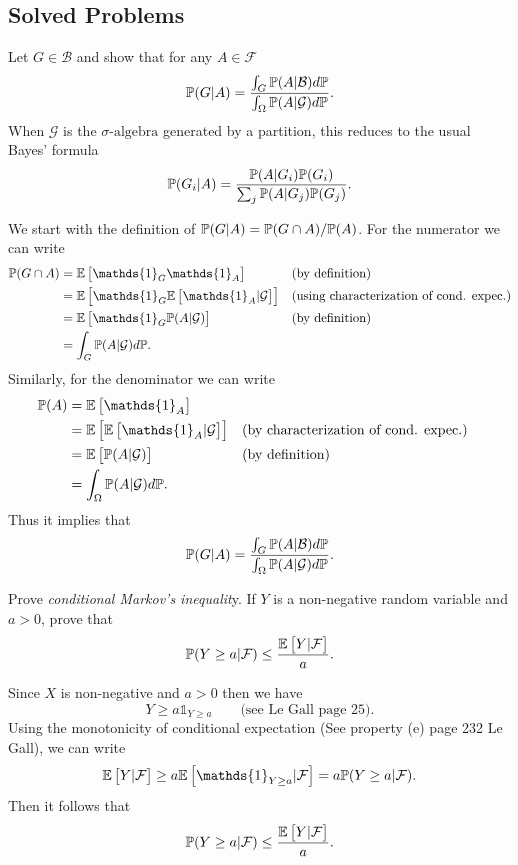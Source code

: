 \subsection{Solved Problems}
\begin{problem}
	Let $ G \in \mathcal{B} $ and show that for any $ A \in \mathcal{F} $
	\[ \mathbb{P}(G|A) = \frac{\int_G\mathbb{P}(A|\mathcal{B}) d\mathbb{P}}{\int_\Omega \mathbb{P}(A|\mathcal{G})d\mathbb{P}}.  \]
	When $ \mathcal{G} $ is the $\sigma\text{-algebra}$ generated by a partition, this reduces to the usual Bayes' formula
	\[ \mathbb{P}(G_i|A) = \frac{\mathbb{P}(A|G_i) \mathbb{P}(G_i)}{\sum_{j}\mathbb{P}(A|G_j)\mathbb{P}(G_j)}. \]
\end{problem}
\begin{solution}
	We start with the definition of $ \mathbb{P}(G|A) = \mathbb{P}(G\cap A)/\mathbb{P}(A) $. For the numerator we can write
	\begin{align*}
		\prob(G\cap A) &= \E{\mathds{1}_G\mathds{1}_A} && \text{(by definition)} \\
		&= \E{\mathds{1}_G \E{\mathds{1}_A|\mathcal{G}}} && \text{(using characterization of cond. expec.)} \\
		&= \E{\mathds{1}_G \prob(A|\mathcal{G})} && \text{(by definition)} \\ 
		&= \int_G \prob(A|\mathcal{G})d\prob.
	\end{align*}
	Similarly, for the denominator we can write
	\begin{align*}
		\prob(A) &= \E{\mathds{1}_A} \\
		&= \E{\E{\mathds{1}_A|\mathcal{G}}}  && \text{(by characterization of cond. expec.)} \\
		&= \E{\prob(A|\mathcal{G})} && \text{(by definition)} \\
		&= \int_\Omega \prob(A|\mathcal{G}) d\prob. 
	\end{align*}
	Thus it implies that 
	\[ \mathbb{P}(G|A) = \frac{\int_G\mathbb{P}(A|\mathcal{B}) d\mathbb{P}}{\int_\Omega \mathbb{P}(A|\mathcal{G})d\mathbb{P}}. \]
\end{solution}

\begin{problem}
	Prove \emph{conditional Markov's inequalit}y. If $ Y $ is a non-negative random variable and $ a>0 $, prove that
	\[ \mathbb{P}(Y\geq a|\mathcal{F}) \leq \frac{\mathbb{E}\left[Y|\mathcal{F}\right]}{a}. \]
\end{problem}
\begin{solution}
	Since $ X $ is non-negative and $ a>0 $ then we have
	\[ Y \geq a\mathds{1}_{Y\geq a} \qquad \text{(see Le Gall page 25)}. \]
	Using the monotonicity of conditional expectation (See property (e) page 232 Le Gall), we can write
	\[ \E{Y|\mathcal{F}} \geq a\E{\mathds{1}_{Y\geq a} |\mathcal{F}} = a\prob(Y\geq a|\mathcal{F}). \]
	Then it follows that
	\[ \mathbb{P}(Y\geq a|\mathcal{F}) \leq \frac{\mathbb{E}\left[Y|\mathcal{F}\right]}{a}. \]
\end{solution}


